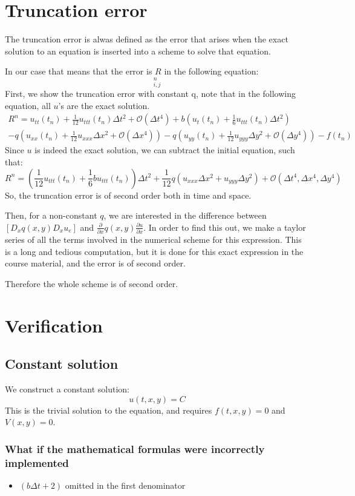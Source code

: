 \documentclass[a4paper]{article}
\begin{document}
\section{Truncation error}
The truncation error is alwas defined as the error that arises when the exact solution to an equation is inserted into a scheme to solve that equation.

In our case that means that the error is $R$ in the following equation:
\begin{equation}
	[D_tD_t u_e + bD_tu_e = D_xqD_xu_e + D_yqD_yu_e + f + R]_{i,j}^n
\end{equation}
First, we show the truncation error with constant q, note that in the following equation, all $u$'s are the exact solution.
\begin{eqnarray*}
R^n = u_{tt}(t_n) + \frac{1}{12}u_{ttt}(t_n) \Delta t^2 + \mathcal{O}(\Delta t^4)
+ b(u_t(t_n) + \frac{1}{6}u_{ttt}(t_n) \Delta t^2) \\
- q(u_{xx}(t_n) + \frac{1}{12}u_{xxx}\Delta x^2 + \mathcal{O}(\Delta x^4))
- q(u_{yy}(t_n) + \frac{1}{12}u_{yyy}\Delta y^2 + \mathcal{O}(\Delta y^4))
- f(t_n)
\end{eqnarray*}
Since $u$ is indeed the exact solution, we can subtract the initial equation, such that:
\begin{equation}
R^n = \left(\frac{1}{12}u_{ttt}(t_n) + \frac{1}{6}bu_{ttt}(t_n)\right)\Delta t^2 
+ \frac{1}{12}q\left(u_{xxx}\Delta x^2 + u_{yyy}\Delta y^2 \right) + \mathcal{O}(\Delta t^4, \Delta x^4, \Delta y^4)
\end{equation}
So, the truncation error is of second order both in time and space. 

Then, for a non-constant $q$, we are interested in the difference between $[D_xq(x, y)D_x u_e]$ and $\frac{\partial}{\partial x} q(x, y) \frac{\partial u}{\partial x}$. In order to find this out, we make a taylor series of all the terms involved in the numerical scheme for this expression. This is a long and tedious computation, but it is done for this exact expression in the course material, and the error is of second order.

Therefore the whole scheme is of second order. 

\section{Verification}
\subsection{Constant solution}
We construct a constant solution:
\begin{equation}
u(t, x, y) = C
\end{equation}
This is the trivial solution to the equation, and requires $f(t, x, y) = 0$ and $V(x, y) = 0$. 

\subsubsection{What if the mathematical formulas were incorrectly implemented}
\begin{itemize}
\item $(b\Delta t +2)$ omitted in the first denominator

\end{itemize}
\end{document}
